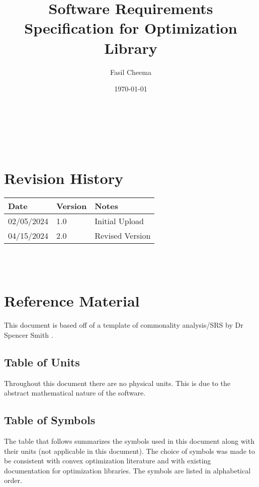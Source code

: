 \documentclass[12pt]{article}
\begin{document}
\title{Software Requirements Specification for Optimization Library} 
\author{Fasil Cheema}
\date{\today}
	
\maketitle

~\newpage


\tableofcontents

~\newpage

\section*{Revision History}

\begin{tabularx}{\textwidth}{p{3cm}p{2cm}X}
\toprule {\bf Date} & {\bf Version} & {\bf Notes}\\
\midrule
02/05/2024 & 1.0 & Initial Upload\\
04/15/2024 & 2.0 & Revised Version\\
\bottomrule
\end{tabularx}

~\\

~\newpage

\section{Reference Material}

This document is based off of a template of commonality analysis/SRS by Dr Spencer Smith \citep{Ssmith}.

\subsection{Table of Units}

Throughout this document there are no physical units. This is due to the abstract mathematical nature of the software. 

\subsection{Table of Symbols}

The table that follows summarizes the symbols used in this document along with
their units (not applicable in this document).  The choice of symbols was made to be consistent with convex optimization literature and with existing documentation for optimization libraries.  The symbols are listed in alphabetical order.
\end{document}
